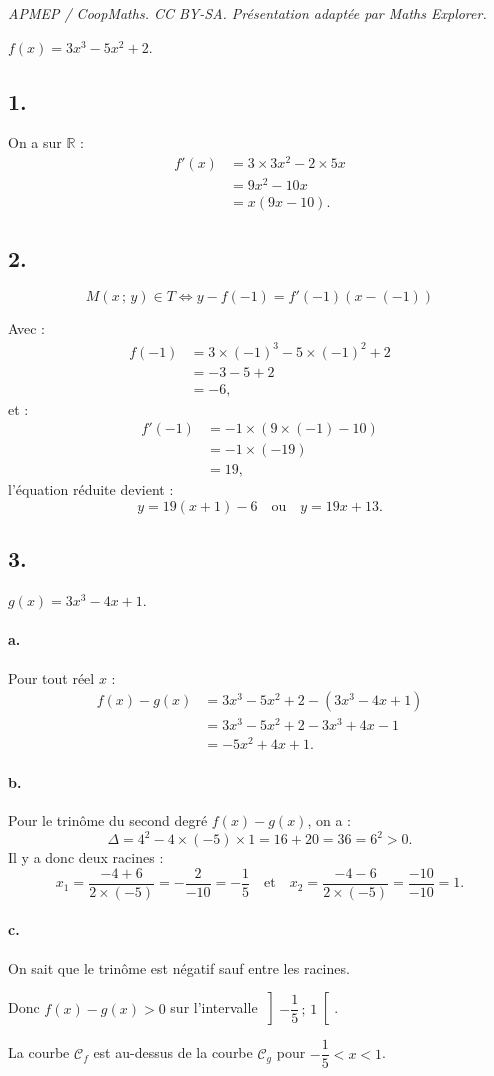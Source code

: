 \documentclass[10pt]{article}
\begin{document}
\noindent\textit{APMEP / CoopMaths. CC BY-SA. Présentation adaptée par Maths Explorer.}\par\medskip
\( f(x) = 3x^3 - 5x^2 + 2 \).

\subsection*{1.}

On a sur \( \mathbb{R} \) :
\begin{align*}
f'(x) &= 3 \times 3x^2 - 2 \times 5x \\
&= 9x^2 - 10x \\
&= x(9x - 10).
\end{align*}

\subsection*{2.}

\[
M(x \,;\, y) \in T \iff y - f(-1) = f'(-1)(x - (-1))
\]

Avec :
\begin{align*}
f(-1) &= 3 \times (-1)^3 - 5 \times (-1)^2 + 2 \\
&= -3 - 5 + 2 \\
&= -6, 
\end{align*}
et :
\begin{align*}
f'(-1) &= -1 \times (9 \times (-1) - 10) \\
&= -1 \times (-19) \\
&= 19,
\end{align*}
l'équation réduite devient :
\[
y = 19(x + 1) - 6 \quad \text{ou} \quad y = 19x + 13.
\]

\subsection*{3.}

\( g(x) = 3x^3 - 4x + 1 \).

\paragraph{a.} Pour tout réel \(x\) :
\begin{align*}
f(x) - g(x) &= 3x^3 - 5x^2 + 2 - (3x^3 - 4x + 1) \\
&= 3x^3 - 5x^2 + 2 - 3x^3 + 4x - 1 \\
&= -5x^2 + 4x + 1.
\end{align*}

\paragraph{b.} Pour le trinôme du second degré \( f(x) - g(x) \), on a :
\[
\Delta = 4^2 - 4 \times (-5) \times 1 = 16 + 20 = 36 = 6^2 > 0.
\]
Il y a donc deux racines :
\[
x_1 = \dfrac{-4 + 6}{2 \times (-5)} = -\dfrac{2}{-10} = -\dfrac{1}{5} \quad \text{et} \quad x_2  = \dfrac{-4 - 6}{2 \times (-5)} = \dfrac{-10}{-10} = 1.
\]

\paragraph{c.} On sait que le trinôme est négatif sauf entre les racines.

Donc \( f(x) - g(x) > 0\) sur l'intervalle \(\left]-\dfrac{1}{5}\,;\,1\right[\).

La courbe \( \mathcal{C}_f \) est au-dessus de la courbe \( \mathcal{C}_g \) pour \( -\dfrac{1}{5} < x < 1 \).
\end{document}

